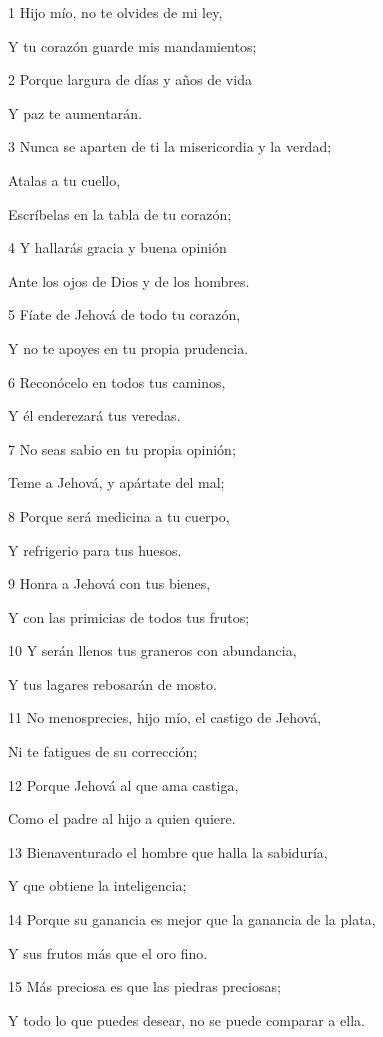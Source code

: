 \par 1 Hijo mío, no te olvides de mi ley,
\par Y tu corazón guarde mis mandamientos;
\par 2 Porque largura de días y años de vida
\par Y paz te aumentarán.
\par 3 Nunca se aparten de ti la misericordia y la verdad;
\par Atalas a tu cuello,
\par Escríbelas en la tabla de tu corazón;
\par 4 Y hallarás gracia y buena opinión
\par Ante los ojos de Dios y de los hombres. 
\par 5 Fíate de Jehová de todo tu corazón,
\par Y no te apoyes en tu propia prudencia.
\par 6 Reconócelo en todos tus caminos,
\par Y él enderezará tus veredas.
\par 7 No seas sabio en tu propia opinión; 
\par Teme a Jehová, y apártate del mal;
\par 8 Porque será medicina a tu cuerpo,
\par Y refrigerio para tus huesos.
\par 9 Honra a Jehová con tus bienes, 
\par Y con las primicias de todos tus frutos;
\par 10 Y serán llenos tus graneros con abundancia,
\par Y tus lagares rebosarán de mosto.
\par 11 No menosprecies, hijo mío, el castigo de Jehová,
\par Ni te fatigues de su corrección; 
\par 12 Porque Jehová al que ama castiga, 
\par Como el padre al hijo a quien quiere. 
\par 13 Bienaventurado el hombre que halla la sabiduría,
\par Y que obtiene la inteligencia;
\par 14 Porque su ganancia es mejor que la ganancia de la plata,
\par Y sus frutos más que el oro fino.
\par 15 Más preciosa es que las piedras preciosas;
\par Y todo lo que puedes desear, no se puede comparar a ella.
